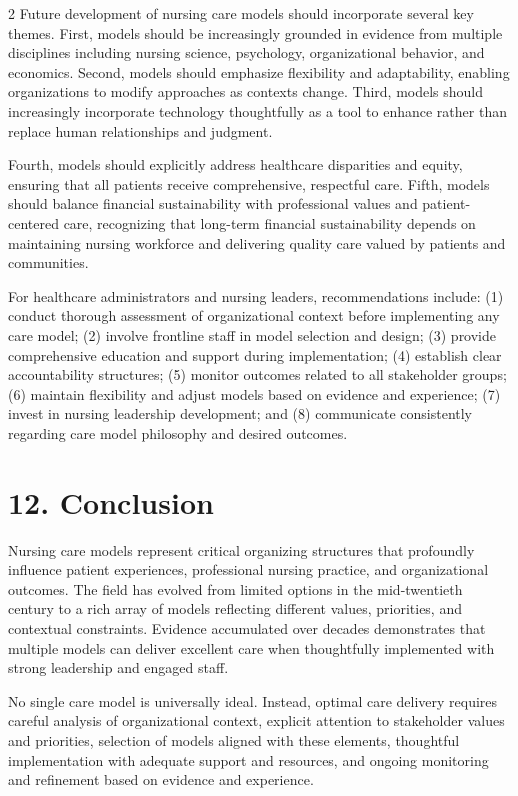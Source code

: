 \documentclass[12pt]{article}
\begin{document}
\begin{multicols}{2}
Future development of nursing care models should incorporate several key themes. First, models should be increasingly grounded in evidence from multiple disciplines including nursing science, psychology, organizational behavior, and economics. Second, models should emphasize flexibility and adaptability, enabling organizations to modify approaches as contexts change. Third, models should increasingly incorporate technology thoughtfully as a tool to enhance rather than replace human relationships and judgment.

Fourth, models should explicitly address healthcare disparities and equity, ensuring that all patients receive comprehensive, respectful care. Fifth, models should balance financial sustainability with professional values and patient-centered care, recognizing that long-term financial sustainability depends on maintaining nursing workforce and delivering quality care valued by patients and communities.

For healthcare administrators and nursing leaders, recommendations include: (1) conduct thorough assessment of organizational context before implementing any care model; (2) involve frontline staff in model selection and design; (3) provide comprehensive education and support during implementation; (4) establish clear accountability structures; (5) monitor outcomes related to all stakeholder groups; (6) maintain flexibility and adjust models based on evidence and experience; (7) invest in nursing leadership development; and (8) communicate consistently regarding care model philosophy and desired outcomes.

\section*{12. \quad Conclusion}

Nursing care models represent critical organizing structures that profoundly influence patient experiences, professional nursing practice, and organizational outcomes. The field has evolved from limited options in the mid-twentieth century to a rich array of models reflecting different values, priorities, and contextual constraints. Evidence accumulated over decades demonstrates that multiple models can deliver excellent care when thoughtfully implemented with strong leadership and engaged staff.

No single care model is universally ideal. Instead, optimal care delivery requires careful analysis of organizational context, explicit attention to stakeholder values and priorities, selection of models aligned with these elements, thoughtful implementation with adequate support and resources, and ongoing monitoring and refinement based on evidence and experience.


\end{multicols}
\end{document}
